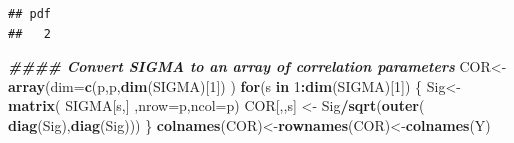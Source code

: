 \documentclass[12pt]{article}
\newenvironment{Shaded}{\begin{snugshade}}{\end{snugshade}}
\newcommand{\AttributeTok}[1]{\textcolor[rgb]{0.13,0.29,0.53}{#1}}
\newcommand{\ControlFlowTok}[1]{\textcolor[rgb]{0.13,0.29,0.53}{\textbf{#1}}}
\newcommand{\DecValTok}[1]{\textcolor[rgb]{0.00,0.00,0.81}{#1}}
\newcommand{\DocumentationTok}[1]{\textcolor[rgb]{0.56,0.35,0.01}{\textbf{\textit{#1}}}}
\newcommand{\FunctionTok}[1]{\textcolor[rgb]{0.13,0.29,0.53}{\textbf{#1}}}
\newcommand{\NormalTok}[1]{#1}
\newcommand{\OtherTok}[1]{\textcolor[rgb]{0.56,0.35,0.01}{#1}}
\newcommand{\SpecialCharTok}[1]{\textcolor[rgb]{0.81,0.36,0.00}{\textbf{#1}}}
\begin{document}
\begin{verbatim}
## pdf 
##   2
\end{verbatim}

\begin{Shaded}
\begin{Highlighting}[]
\DocumentationTok{\#\#\#\# Convert SIGMA to an array of correlation parameters}
\NormalTok{COR}\OtherTok{\textless{}{-}}\FunctionTok{array}\NormalTok{(}\AttributeTok{dim=}\FunctionTok{c}\NormalTok{(p,p,}\FunctionTok{dim}\NormalTok{(SIGMA)[}\DecValTok{1}\NormalTok{]) )}
\ControlFlowTok{for}\NormalTok{(s }\ControlFlowTok{in} \DecValTok{1}\SpecialCharTok{:}\FunctionTok{dim}\NormalTok{(SIGMA)[}\DecValTok{1}\NormalTok{]) \{}
\NormalTok{Sig}\OtherTok{\textless{}{-}}\FunctionTok{matrix}\NormalTok{( SIGMA[s,] ,}\AttributeTok{nrow=}\NormalTok{p,}\AttributeTok{ncol=}\NormalTok{p)}
\NormalTok{COR[,,s] }\OtherTok{\textless{}{-}}\NormalTok{ Sig}\SpecialCharTok{/}\FunctionTok{sqrt}\NormalTok{(}\FunctionTok{outer}\NormalTok{( }\FunctionTok{diag}\NormalTok{(Sig),}\FunctionTok{diag}\NormalTok{(Sig)))}
\NormalTok{                           \}}
\FunctionTok{colnames}\NormalTok{(COR)}\OtherTok{\textless{}{-}}\FunctionTok{rownames}\NormalTok{(COR)}\OtherTok{\textless{}{-}}\FunctionTok{colnames}\NormalTok{(Y)}




\end{Highlighting}
\end{Shaded}
\end{document}
